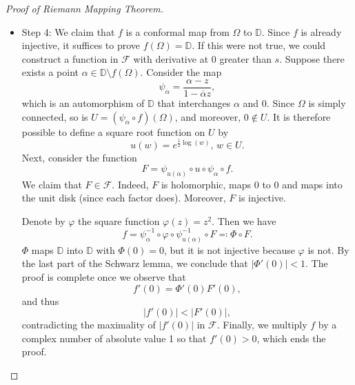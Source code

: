 \documentclass{article}
\theoremstyle{definition}
\renewcommand{\geq}{\geqslant}
\renewcommand{\le}{\leqslant}
\begin{document}
\begin{proof}[Proof of Riemann Mapping Theorem]
\begin{itemize}
        \textbf{Goal}: find \(f\in\mathcal{F}\) such that \(|f^{\prime}(0)|\) is maximal.

        By Cauchy's estimates, $|f^{\prime}(0)|$ is bounded. Suppose $s=\sup_{f\in \mathcal{F}}|f^{\prime}(0)|$. Then we can choose a sequence $(f_n)$ in $\mathcal{F}$ such that $\lim_{n\to \infty} |f_n^{\prime}(0)|=s$. 
        By Montel's theorem, there exists a subsequence $(f_{n_k})$ which converges uniformly on every compact subset of $\Omega$ to a holomorphic function $f\colon \Omega \to \overline{\mathbb{D}}$. 
        Since $s\geq 1$ (because the identity map is in $\mathcal{F}$), $f$ is non-constant. Since \(f\) is non-constant and \(|f|\le 1\) on \(\Omega\), the maximum modulus principle implies that \(|f(z)|<1\) for all \(z\in\Omega\). Hence \(f\) indeed maps into \(\mathbb D\). Moreover, by Hurwitz's theorem, $f$ is injective.
        Since we clearly have $f(0)=0$, we obtain $f\in \mathcal{F}$ with $|f^{\prime}(0)|=s$.
        \item Step 4: We claim that $f$ is a conformal map from $\Omega$ to $\mathbb{D}$. Since $f$ is already injective, it suffices to prove \(f(\Omega)=\mathbb{D}\). 
        If this were not true, we could construct a function in $\mathcal{F}$ with derivative at $0$ greater than $s$. Suppose there exists a point \(\alpha\in\mathbb{D}\setminus f(\Omega)\). Consider the map 
        \[\psi_\alpha=\frac{\alpha-z}{1-\overline{\alpha}z},\]
        which is an automorphism of \(\mathbb{D}\) that interchanges \(\alpha\) and \(0\). Since $\Omega$ is simply connected, so is $U=(\psi_\alpha\circ f)(\Omega)$, and moreover, $0\notin U$. 
        It is therefore possible to define a square root function on $U$ by
        \begin{equation*}
            u(w) = e^{\frac{1}{2}\log(w)},\, w\in U.
        \end{equation*}
         Next, consider the function
         \begin{equation*}
            F=\psi_{u(\alpha)}\circ u \circ \psi_\alpha \circ f.
         \end{equation*}
         We claim that $F\in\mathcal{F}$. Indeed, $F$ is holomorphic, maps $0$ to $0$ and maps into the unit disk (since each factor does). Moreover, $F$ is injective. 

         Denote by $\varphi$ the square function $\varphi(z)=z^2$. Then we have
         \begin{equation*}
            f=\psi_\alpha^{-1}\circ \varphi \circ \psi_{u(\alpha)}^{-1} \circ F\eqcolon \Phi\circ F.
         \end{equation*}
         \(\Phi\) maps \(\mathbb{D}\) into \(\mathbb{D}\) with \(\Phi(0) = 0\), but it is not injective because \(\varphi\) is not. By the last part of the Schwarz lemma, we conclude that \(|\Phi'(0)| < 1\). The proof is complete once we observe that
         \[f'(0) = \Phi'(0) F'(0),\]
         and thus \[|f'(0)| < |F'(0)|,\] contradicting the maximality of \(|f'(0)|\) in \(\mathcal{F}\). Finally, we multiply \(f\) by a complex number of absolute value 1 so that \(f'(0) > 0\), which ends the proof.
    \end{itemize}
\end{proof}
\end{document}
